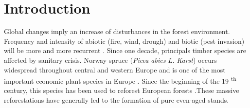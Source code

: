 \documentclass[3p,procedia]{elsarticle}
\begin{document}
\linenumbers

\pagebreak
\section{Introduction}


Global changes imply an increase of disturbances in the forest environment.
Frequency and intensity of abiotic (fire, wind, drough) and biotic (pest invasion) will be more and more recurrent \citep{lindner_climate_2010}. 
Since one decade, principals timber species are affected by sanitary crisis.
Norway spruce (\textit{Picea abies L. Karst}) occurs widespread throughout central and western Europe and is one of the most important economic plant species in Europe \citep{nystedt_norway_2013}.
Since the beginning of the 19 \textsuperscript{th} century, this species has been used to reforest European forests
\citep{3PresentDistributionofSecondaryNorwaySpruceinEurope}.These massive reforestations have generally led to the formation of pure even-aged stands. 
\end{document}
